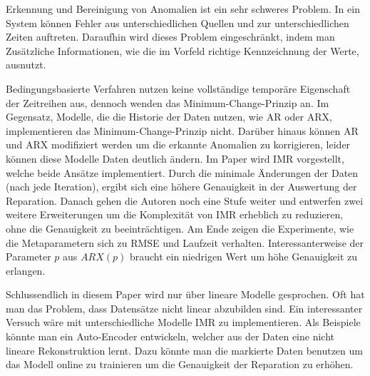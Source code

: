Erkennung und Bereinigung von Anomalien ist ein sehr schweres Problem. In ein
System können Fehler  aus unterschiedlichen Quellen und zur
unterschiedlichen Zeiten auftreten. Daraufhin wird dieses Problem
eingeschränkt, indem man Zusätzliche Informationen, wie die im Vorfeld richtige
Kennzeichnung der Werte, ausnutzt. 

Bedingungsbasierte Verfahren nutzen keine vollständige temporäre
Eigenschaft der Zeitreihen aus, dennoch wenden das
Minimum-Change-Prinzip an. Im Gegensatz, Modelle, die die Historie der Daten 
nutzen, wie AR oder ARX, implementieren das Minimum-Change-Prinzip nicht.
Darüber hinaus können AR und ARX modifiziert werden um die erkannte Anomalien
zu korrigieren, leider können diese Modelle Daten deutlich ändern. Im Paper
wird IMR vorgestellt, welche beide Ansätze implementiert. Durch die minimale
Änderungen der Daten (nach jede Iteration), ergibt sich eine höhere Genauigkeit
in der Auswertung der Reparation. Danach gehen die Autoren noch eine Stufe weiter und
entwerfen zwei weitere Erweiterungen um die Komplexität von IMR erheblich zu
reduzieren, ohne die Genauigkeit zu beeinträchtigen. Am Ende zeigen die
Experimente, wie die Metaparametern sich zu RMSE und Laufzeit verhalten.
Interessanterweise der Parameter $p$ aus $ARX(p)$ braucht ein niedrigen Wert um
höhe Genauigkeit zu erlangen.

Schlussendlich in diesem Paper wird nur über lineare Modelle gesprochen. Oft
hat man das Problem, dass Datensätze nicht linear abzubilden sind. Ein
interessanter Versuch wäre mit unterschiedliche Modelle IMR zu implementieren.
Als Beispiele könnte man ein Auto-Encoder entwickeln, welcher aus der Daten
eine nicht lineare Rekonstruktion lernt. Dazu könnte man die markierte Daten
benutzen um das Modell online zu trainieren um die Genauigkeit der Reparation
zu erhöhen.
